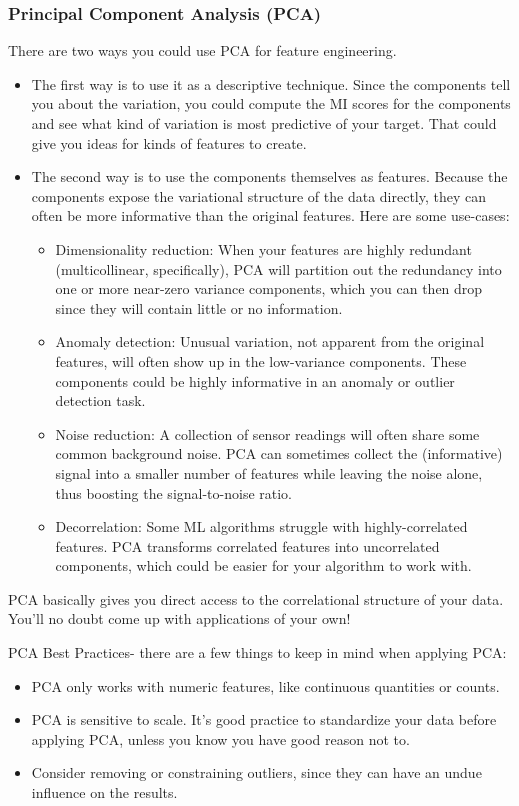 \documentclass[12pt]{report}
\begin{document}
\subsubsection{Principal Component Analysis (PCA)}
There are two ways you could use PCA for feature engineering.

\begin{itemize}
  \item The first way is to use it as a descriptive technique. Since the components tell you about the variation, you could compute the MI scores for the components and see what kind of variation is most predictive of your target. That could give you ideas for kinds of features to create.
  \item The second way is to use the components themselves as features. Because the components expose the variational structure of the data directly, they can often be more informative than the original features. Here are some use-cases:
  \begin{itemize}
    \item Dimensionality reduction: When your features are highly redundant (multicollinear, specifically), PCA will partition out the redundancy into one or more near-zero variance components, which you can then drop since they will contain little or no information.
    \item Anomaly detection: Unusual variation, not apparent from the original features, will often show up in the low-variance components. These components could be highly informative in an anomaly or outlier detection task.
    \item Noise reduction: A collection of sensor readings will often share some common background noise. PCA can sometimes collect the (informative) signal into a smaller number of features while leaving the noise alone, thus boosting the signal-to-noise ratio.
    \item Decorrelation: Some ML algorithms struggle with highly-correlated features. PCA transforms correlated features into uncorrelated components, which could be easier for your algorithm to work with.
  \end{itemize}
\end{itemize}

PCA basically gives you direct access to the correlational structure of your data. You'll no doubt come up with applications of your own!

PCA Best Practices- there are a few things to keep in mind when applying PCA:
\begin{itemize}
\item PCA only works with numeric features, like continuous quantities or counts.
\item PCA is sensitive to scale. It's good practice to standardize your data before applying PCA, unless you know you have good reason not to.
\item Consider removing or constraining outliers, since they can have an undue influence on the results.
\end{itemize}
\end{document}
